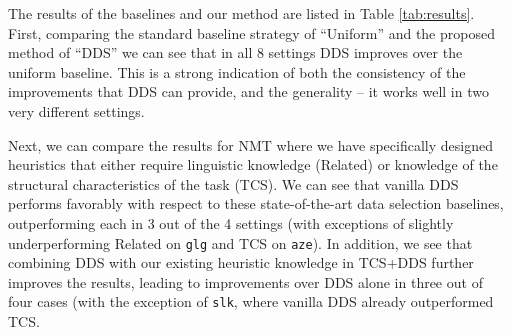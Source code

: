 
The results of the baselines and our method are listed in Table \ref{tab:results}.
First, comparing the standard baseline strategy of ``Uniform'' and the proposed method of ``DDS'' we can see that in all 8 settings DDS improves over the uniform baseline.
This is a strong indication of both the consistency of the improvements that DDS can provide, and the generality -- it works well in two very different settings.

Next, we can compare the results for NMT where we have specifically designed heuristics that either require linguistic knowledge (Related) or knowledge of the structural characteristics of the task (TCS).
We can see that vanilla DDS performs favorably with respect to these state-of-the-art data selection baselines, outperforming each in 3 out of the 4 settings (with exceptions of slightly underperforming Related on \texttt{glg} and TCS on \texttt{aze}).
In addition, we see that combining DDS with our existing heuristic knowledge in TCS+DDS further improves the results, leading to improvements over DDS alone in three out of four cases (with the exception of \texttt{slk}, where vanilla DDS already outperformed TCS.
